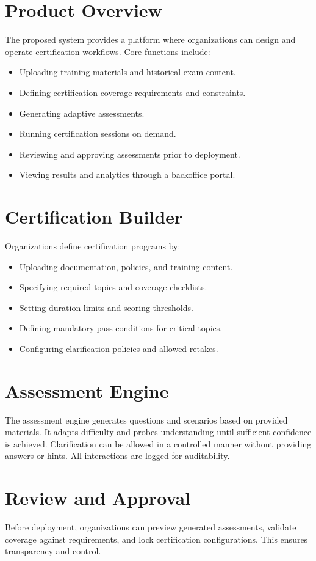 \documentclass[11pt]{article}
\begin{document}
\section{Product Overview}
The proposed system provides a platform where organizations can design and operate certification workflows. Core functions include:
\begin{itemize}[noitemsep]
\item Uploading training materials and historical exam content.
\item Defining certification coverage requirements and constraints.
\item Generating adaptive assessments.
\item Running certification sessions on demand.
\item Reviewing and approving assessments prior to deployment.
\item Viewing results and analytics through a backoffice portal.
\end{itemize}

\section{Certification Builder}
Organizations define certification programs by:
\begin{itemize}[noitemsep]
\item Uploading documentation, policies, and training content.
\item Specifying required topics and coverage checklists.
\item Setting duration limits and scoring thresholds.
\item Defining mandatory pass conditions for critical topics.
\item Configuring clarification policies and allowed retakes.
\end{itemize}

\section{Assessment Engine}
The assessment engine generates questions and scenarios based on provided materials. It adapts difficulty and probes understanding until sufficient confidence is achieved. Clarification can be allowed in a controlled manner without providing answers or hints. All interactions are logged for auditability.

\section{Review and Approval}
Before deployment, organizations can preview generated assessments, validate coverage against requirements, and lock certification configurations. This ensures transparency and control.
\end{document}
